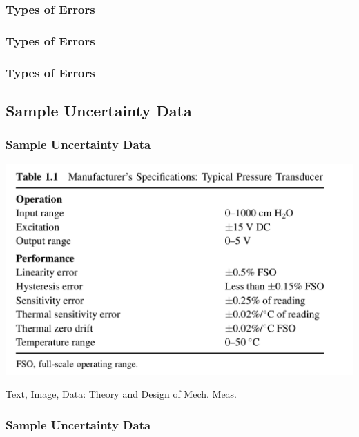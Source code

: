 \documentclass[fleqn]{beamer} %
\newcommand{\sectionIIsubsectionIIItitle}{Types of Errors}
\newcommand{\sectionIIsubsectionIVtitle}{Sample Uncertainty Data}
\begin{document}
			\begin{frame}
				\frametitle{\sectionIIsubsectionIIItitle}

				

			\end{frame}

			\begin{frame}
				\frametitle{\sectionIIsubsectionIIItitle}

			\end{frame}

			\begin{frame}
			\frametitle{\sectionIIsubsectionIIItitle}





			\end{frame}

		\subsection{\sectionIIsubsectionIVtitle}\label{sectionIIsubsectionIV}

			\begin{frame}
				\frametitle{\sectionIIsubsectionIVtitle}

				\includegraphics[scale=.22]{images/sample_uncertainties.png}

				{\tiny Text, Image, Data: Theory and Design of Mech. Meas.}


			\end{frame}

			\begin{frame}
				\frametitle{\sectionIIsubsectionIVtitle}




			\end{frame}
\end{document}
